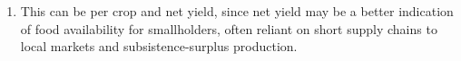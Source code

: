 \documentclass[11pt]{article}
\providecommand{\tightlist}{%
      \setlength{\itemsep}{0pt}\setlength{\parskip}{0pt}}
\begin{document}
\begin{enumerate}
\def\labelenumi{\alph{enumi}.}
\tightlist
\item
  This can be per crop and net yield, since net yield may be a better
  indication of food availability for smallholders, often reliant on
  short supply chains to local markets and subsistence-surplus
  production.
\end{enumerate}

    

    


    
    
    
    
\end{document}
